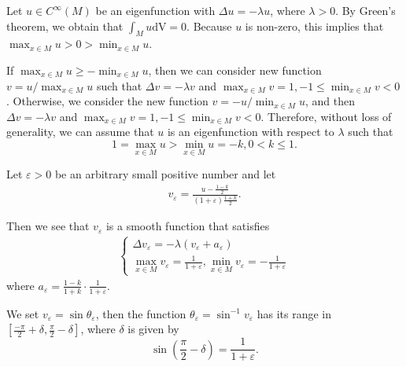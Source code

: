 \documentclass[11pt]{amsart}
\def\dv{\mathrm{dV}}
\begin{document}
Let $u\in C^\infty(M)$ be an eigenfunction with $\Delta u=-\lambda u$, where $\lambda>0$. By Green's theorem, we obtain that $\int_M{u \dv}=0$. Because $u$ is non-zero, this implies that $\max_{x\in M} u>0>\min_{x\in M} u$.

    If $\max_{x\in M} u\geq -\min_{x\in M} u$, then we can consider new function $v=u/\max_{x\in M} u$ such that $\Delta v=-\lambda v$ and $\max_{x\in M} v=1,-1\leq\min_{x\in M} v<0$. Otherwise, we consider the new function $v=-u/\min_{x\in M} u$, and then $\Delta v=-\lambda v$ and $\max_{x\in M} v=1,-1\leq \min_{x\in M} v<0$. Therefore, without loss of generality, we can assume that $u$ is an eigenfunction with respect to $\lambda$ such that
    $$1=\max_{x\in M} u>\min_{x\in M} u=-k,0<k\leq 1.$$

    Let $\varepsilon>0$ be an arbitrary small positive number and let 
    \begin{align}\label{uia}
        v_{\varepsilon}=\frac{u-\frac{1-k}{2}}{(1+\varepsilon)\frac{1+k}{2}}.
    \end{align}
    
  

    Then we see that $v_\varepsilon$ is a smooth function that satisfies
    \begin{align}
        \left\{\begin{array}{c}
             \Delta v_\varepsilon=-\lambda(v_\varepsilon+a_\varepsilon) \\
             \displaystyle\max_{x\in M} v_\varepsilon=\frac{1}{1+\varepsilon},\min_{x\in M} v_\varepsilon=-\frac{1}{1+\varepsilon}
        \end{array}\right.
    \end{align}where $a_\varepsilon=\frac{1-k}{1+k}\cdot\frac{1}{1+\varepsilon}$.

    We set $v_\varepsilon=\sin\theta_\varepsilon$, then the function $\theta_\varepsilon=\sin^{-1}v_\varepsilon$ has its range in $\left[\frac{-\pi}{2}+\delta,\frac{\pi}{2}-\delta\right]$, where $\delta$ is given by
    $$\sin\left(\frac{\pi}{2}-\delta\right)=\frac{1}{1+\varepsilon}.$$

    
\end{document}
